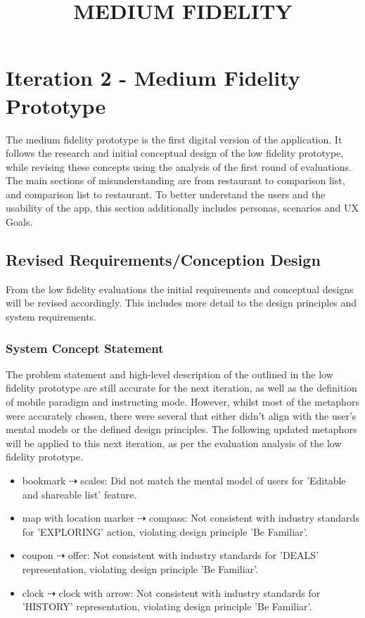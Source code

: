 \documentclass[a4 paper, 12pt]{article}
\title{MEDIUM FIDELITY}
\begin{document}
\section{Iteration 2 - Medium Fidelity Prototype}
The medium fidelity prototype is the first digital version of the application. It follows the research and initial conceptual design of the low fidelity prototype, while revising these concepts using the analysis of the first round of evaluations. The main sections of misunderstanding are from restaurant to comparison list, and comparison list to restaurant. To better understand the users and the usability of the app, this section additionally includes personas, scenarios and UX Goals. 


\subsection{Revised Requirements/Conception Design}
From the low fidelity evaluations the initial requirements and conceptual designs will be revised accordingly. This includes more detail to the design principles and system requirements. 

    \subsubsection{System Concept Statement}
    The problem statement and high-level description of the outlined in the low fidelity prototype are still accurate for the next iteration, as well as the definition of mobile paradigm and instructing mode. However, whilst most of the metaphors were accurately chosen, there were several that either didn't align with the user's mental models or the defined design principles. The following updated metaphors will be applied to this next iteration, as per the evaluation analysis of the low fidelity prototype.
        \begin{itemize}
            \item bookmark $\dashrightarrow$ scales: Did not match the mental model of users for 'Editable and shareable list' feature.
            \item map with location marker $\dashrightarrow$ compass: Not consistent with industry standards for 'EXPLORING' action, violating design principle 'Be Familiar'.             
            \item coupon $\dashrightarrow$ offer: Not consistent with industry standards for 'DEALS' representation, violating design principle 'Be Familiar'. 
            \item clock $\dashrightarrow$ clock with arrow: Not consistent with industry standards for 'HISTORY' representation, violating design principle 'Be Familiar'. 
        \end{itemize}
\end{document}
